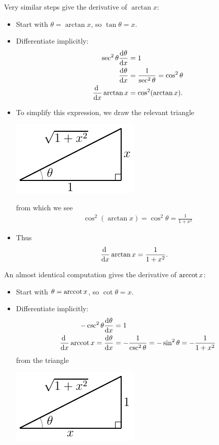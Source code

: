 \begin{eg}
Very similar steps give the derivative of $\arctan x$:
\begin{itemize}
 \item Start with $\theta = \arctan x$, so $\tan \theta = x$.
\item Differentiate implicitly:
  \begin{align*}
  \sec^2 \theta \diff{\theta}{x} &= 1 \\
  \diff{\theta}{x} &= \frac{1}{\sec^2 \theta} = \cos^2 \theta\\
  \diff{}{x}\arctan x &= \cos^2(\arctan x).
\end{align*}
\item To simplify this expression, we draw the relevant triangle
\begin{efig}
\begin{center}
  \includegraphics{triangleAtan}
\end{center}
\end{efig}
from which we see
\begin{align*}
\cos^2(\arctan x) = \cos^2\theta = \frac{1}{1+x^2}
\end{align*}
\item Thus
\begin{align*}
  \diff{}{x}\arctan x &= \frac{1}{1+x^2}.
\end{align*}
\end{itemize}
An almost identical computation gives the derivative of $\mathop{\mathrm{arccot}} x$:
\begin{itemize}
 \item Start with $\theta = \mathop{\mathrm{arccot}} x$, so $\cot \theta = x$.
\item Differentiate implicitly:
  \begin{align*}
  -\csc^2 \theta \diff{\theta}{x} &= 1 \\
\diff{}{x}\arccot x =
  \diff{\theta}{x} &= -\frac{1}{\csc^2 \theta} = -\sin^2 \theta
                      =-\frac{1}{1+x^2}
\end{align*}
 from the triangle
\begin{efig}
\begin{center}
  \includegraphics{triangleAcot}
\end{center}
\end{efig}
\end{itemize}
\end{eg}




